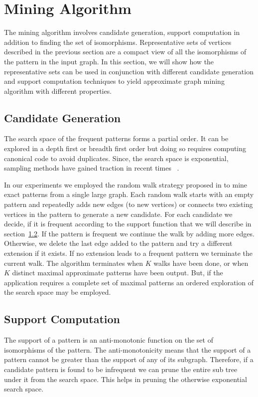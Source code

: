 \section{Mining Algorithm}
\label{sec:mining}
 The mining algorithm involves candidate generation, support computation in
 addition to finding the set of isomorphisms.  Representative sets of vertices
 described in the previous section are a compact view of all the isomorphisms of
 the pattern in the input graph. In this section, we will show how the
 representative sets can be used in conjunction with different candidate
 generation and support computation techniques to yield approximate graph mining
 algorithm with different properties.


\subsection{Candidate Generation} 

The search space of the frequent patterns forms a partial order.  It can be
explored in a depth first or breadth first order but doing so requires computing
canonical code to avoid duplicates. Since, the search space is exponential,
sampling methods have gained traction in recent
times~\cite{2008-origami:sadm,2009-graphsampling} . 


In our experiments we employed the random walk strategy proposed in
\cite{2011-icdm} to mine exact patterns from a single large graph. Each random
walk starts with an empty pattern and repeatedly adds new edges (to new
vertices) or connects two existing vertices in the pattern to generate a new
candidate.  For each candidate we decide,  if it is frequent according
to the support function that we will describe in section~\ref{sec:support}. If the
pattern is frequent we continue the walk by adding more edges. Otherwise, we
delete the last edge added to the pattern and try a different extension if it
exists. If no extension leads to a frequent pattern we terminate the current
walk.  The algorithm terminates when $K$ walks have been done, or when $K$
distinct maximal approximate patterns have been output. But, if the application
requires a complete set of maximal patterns an ordered exploration of the search
space may be employed.


\subsection{Support Computation} \label{sec:support} The support of a pattern is
an anti-monotonic function on the set of isomorphisms of the pattern. The
anti-monotonicity means that the support of a pattern cannot be greater than the
support of any of its subgraph. Therefore, if a candidate pattern is found to be
infrequent we can prune the entire sub tree under it from the search space.
This helps in pruning the otherwise exponential search space. 

